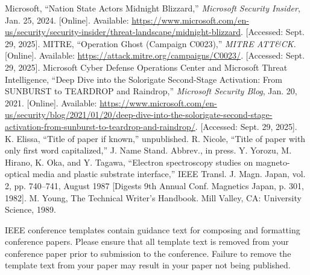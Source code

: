 \documentclass[conference]{IEEEtran}
\begin{document}
\begin{thebibliography}{00}
 Microsoft, ``Nation State Actors Midnight Blizzard,'' \emph{Microsoft Security Insider}, Jan. 25, 2024. [Online]. Available: \url{https://www.microsoft.com/en-us/security/security-insider/threat-landscape/midnight-blizzard}. [Accessed: Sept. 29, 2025].
 MITRE, ``Operation Ghost (Campaign C0023),'' \emph{MITRE ATT\&CK}. [Online]. Available: \url{https://attack.mitre.org/campaigns/C0023/}. [Accessed: Sept. 29, 2025].
 Microsoft Cyber Defense Operations Center and Microsoft Threat Intelligence, ``Deep Dive into the Solorigate Second-Stage Activation: From SUNBURST to TEARDROP and Raindrop,'' \emph{Microsoft Security Blog}, Jan. 20, 2021. [Online]. Available: \url{https://www.microsoft.com/en-us/security/blog/2021/01/20/deep-dive-into-the-solorigate-second-stage-activation-from-sunburst-to-teardrop-and-raindrop/}. [Accessed: Sept. 29, 2025].
 K. Elissa, ``Title of paper if known,'' unpublished.
 R. Nicole, ``Title of paper with only first word capitalized,'' J. Name Stand. Abbrev., in press.
 Y. Yorozu, M. Hirano, K. Oka, and Y. Tagawa, ``Electron spectroscopy studies on magneto-optical media and plastic substrate interface,'' IEEE Transl. J. Magn. Japan, vol. 2, pp. 740--741, August 1987 [Digests 9th Annual Conf. Magnetics Japan, p. 301, 1982].
 M. Young, The Technical Writer's Handbook. Mill Valley, CA: University Science, 1989.
\end{thebibliography}
\vspace{12pt}
\color{red}
IEEE conference templates contain guidance text for composing and formatting conference papers. Please ensure that all template text is removed from your conference paper prior to submission to the conference. Failure to remove the template text from your paper may result in your paper not being published.
\end{document}

